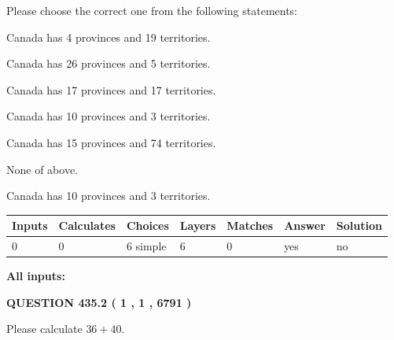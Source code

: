 \documentclass[12pt]{article}
\begin{document}
  
Please choose the correct one from the following statements:
 
 
Canada has   4 provinces and  19 territories.
 
 
Canada has  26 provinces and  5 territories.
 
 
Canada has  17 provinces and  17 territories.
 
 
Canada has 10  provinces and 3 territories.
 
 
Canada has  15 provinces and  74 territories.
 
 
 None of above.
 
 
\noindent{}
 
 
Canada has 10  provinces and 3 territories.
 
 
\noindent{}
 
 
   
   
   
   
\noindent\begin{tabular}{|l|l|l|l|l|l|l|}
 \hline
Inputs & Calculates & Choices & Layers & Matches & Answer & Solution \\ \hline
 0  & 
 0  & 
 6
  simple  
  & 
 6  & 
 0  & 
  yes & 
  no 
  \\ \hline
 \end{tabular}
   
   
   
   
\noindent{}
   
   
   
   
\noindent\vspace{0.1in}\hspace{-0.08in} {\textbf{\Large{All inputs: }}}
   
   
  
\vspace{0.2in}
  
{\textbf{\Large{QUESTION
435.2 
 ( 1 , 1 , 6791 )
}}}
  
  
 
Please calculate $ %
36 +  %
40 $.
 
 
   
\end{document}
